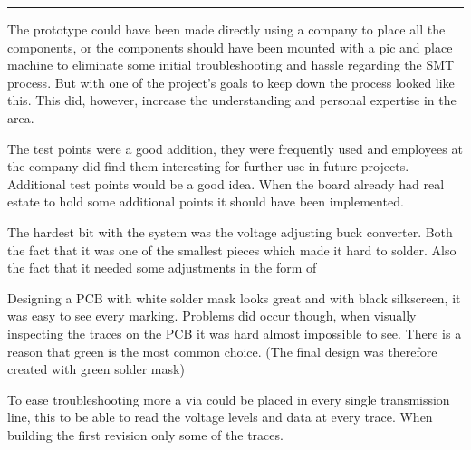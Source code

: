 \vspace{-10ex}%
\rule{\textwidth}{0.3pt}
\vspace{5ex}


The prototype could have been made directly using a company to place all the components, or the components should have been mounted with a pic and place machine to eliminate some initial troubleshooting and hassle regarding the SMT process. But with one of the project's goals to keep down the process looked like this. This did, however, increase the understanding and personal expertise in the area. 
\newline

The test points were a good addition, they were frequently used and employees at the company did find them interesting for further use in future projects.
Additional test points would be a good idea. When the board already had real estate to hold some additional points it should have been implemented. 

The hardest bit with the system was the voltage adjusting buck converter. Both the fact that it was one of the smallest pieces which made it hard to solder. Also the fact that it needed some adjustments in the form of 
\newline

Designing a PCB with white solder mask looks great and with black silkscreen, it was easy to see every marking. Problems did occur though, when visually inspecting the traces on the PCB it was hard almost impossible to see. There is a reason that green is the most common choice. (The final design was therefore created with green solder mask)

To ease troubleshooting more a via could be placed in every single transmission line, this to be able to read the voltage levels and data at every trace. When building the first revision only some of the traces.